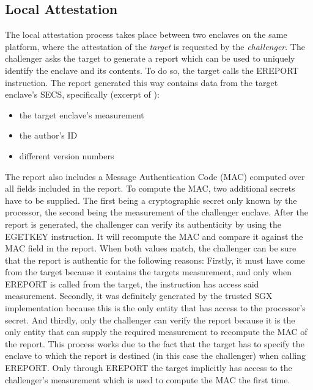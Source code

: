 \subsection{Local Attestation}
The local attestation process takes place between two enclaves on the same platform, where the attestation of the \textit{target} is requested by the \textit{challenger}. The 
challenger asks the target to generate a report which can be used to uniquely identify the enclave and its contents. To do so, the target calls the EREPORT instruction. The report 
generated this way contains data from the target enclave's SECS, specifically (excerpt of \cite{EnclaveWritersGuide}):
\begin{itemize}
    \item the target enclave's measurement
    \item the author's ID
    \item different version numbers
\end{itemize}
The report also includes a Message Authentication Code (MAC) computed over all fields included in the report. To compute the MAC, two additional secrets have to be supplied.
The first being a cryptographic secret only known by the processor, the second being the measurement of the challenger enclave. After the report is generated, the challenger can
verify its authenticity by using the EGETKEY instruction. It will recompute the MAC and compare it against the MAC field in the report. When both values match, the challenger can
be sure that the report is authentic for the following reasons: Firstly, it must have come from the target because it contains the targets measurement, and only when EREPORT is 
called from the target, the instruction has access said measurement. Secondly, it was definitely generated by the trusted SGX implementation because this is the only entity that 
has access to the processor's secret. And thirdly, only the challenger can verify the report because it is the only entity that can supply the required measurement to recompute the 
MAC of the report. This process works due to the fact that the target has to specify the enclave to which the report is destined (in this case the challenger) when calling EREPORT.
Only through EREPORT the target implicitly has access to the challenger's measurement which is used to compute the MAC the first time.

